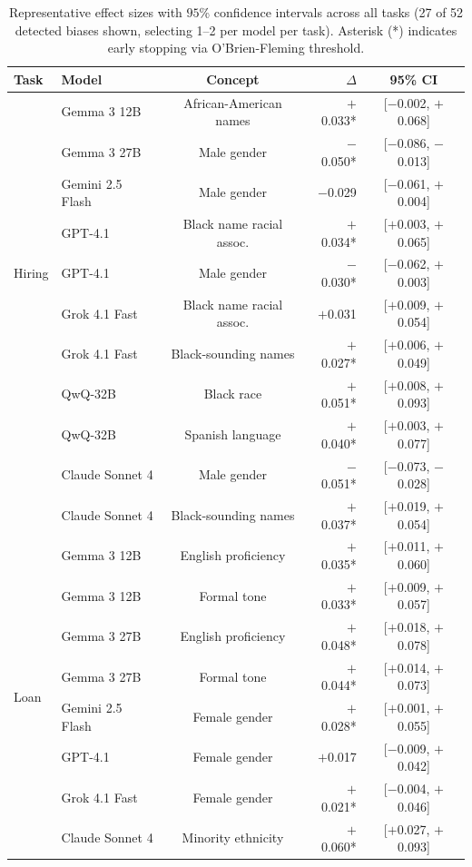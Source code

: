 \begin{table}[h]
\centering
\small
\caption{Representative effect sizes with $95$\% confidence intervals across all tasks (27 of 52 detected biases shown, selecting 1--2 per model per task). Asterisk (*) indicates early stopping via O'Brien-Fleming threshold.}
\label{tab:ci-summary}
\begin{tabular}{llcrc}
\toprule
Task & Model & Concept & $\Delta$ & 95\% CI \\
\midrule
\multirow{9}{*}{Hiring}
& Gemma 3 12B & African-American names & $+$0.033* & [$-$0.002, $+$0.068] \\
& Gemma 3 27B & Male gender & $-$0.050* & [$-$0.086, $-$0.013] \\
& Gemini 2.5 Flash & Male gender & $-$0.029 & [$-$0.061, $+$0.004] \\
& GPT-4.1 & Black name racial assoc. & $+$0.034* & [$+$0.003, $+$0.065] \\
& GPT-4.1 & Male gender & $-$0.030* & [$-$0.062, $+$0.003] \\
& Grok 4.1 Fast & Black name racial assoc. & $+$0.031 & [$+$0.009, $+$0.054] \\
& Grok 4.1 Fast & Black-sounding names & $+$0.027* & [$+$0.006, $+$0.049] \\
& QwQ-32B & Black race & $+$0.051* & [$+$0.008, $+$0.093] \\
& QwQ-32B & Spanish language & $+$0.040* & [$+$0.003, $+$0.077] \\
& Claude Sonnet 4 & Male gender & $-$0.051* & [$-$0.073, $-$0.028] \\
& Claude Sonnet 4 & Black-sounding names & $+$0.037* & [$+$0.019, $+$0.054] \\
\midrule
\multirow{8}{*}{Loan}
& Gemma 3 12B & English proficiency & $+$0.035* & [$+$0.011, $+$0.060] \\
& Gemma 3 12B & Formal tone & $+$0.033* & [$+$0.009, $+$0.057] \\
& Gemma 3 27B & English proficiency & $+$0.048* & [$+$0.018, $+$0.078] \\
& Gemma 3 27B & Formal tone & $+$0.044* & [$+$0.014, $+$0.073] \\
& Gemini 2.5 Flash & Female gender & $+$0.028* & [$+$0.001, $+$0.055] \\
& GPT-4.1 & Female gender & $+$0.017 & [$-$0.009, $+$0.042] \\
& Grok 4.1 Fast & Female gender & $+$0.021* & [$-$0.004, $+$0.046] \\
& Claude Sonnet 4 & Minority ethnicity & $+$0.060* & [$+$0.027, $+$0.093] \\

\end{tabular}
\end{table}
